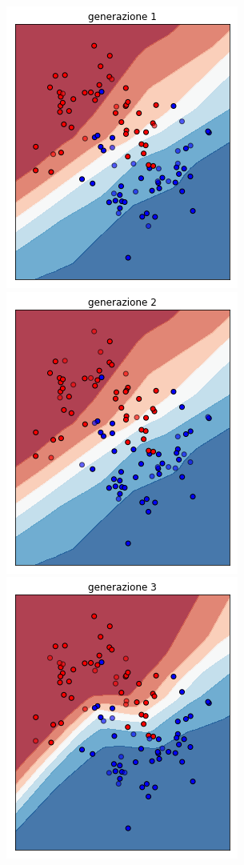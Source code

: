 \documentclass[12pt,a4paper]{report}
\begin{document}
\begin{figure}[H]
 \centering
 \includegraphics[scale = 0.35]{images/moons-sons-acc./1}
 \includegraphics[scale = 0.35]{images/moons-sons-acc./2}
 \includegraphics[scale = 0.35]{images/moons-sons-acc./3}

\end{figure}
\end{document}
